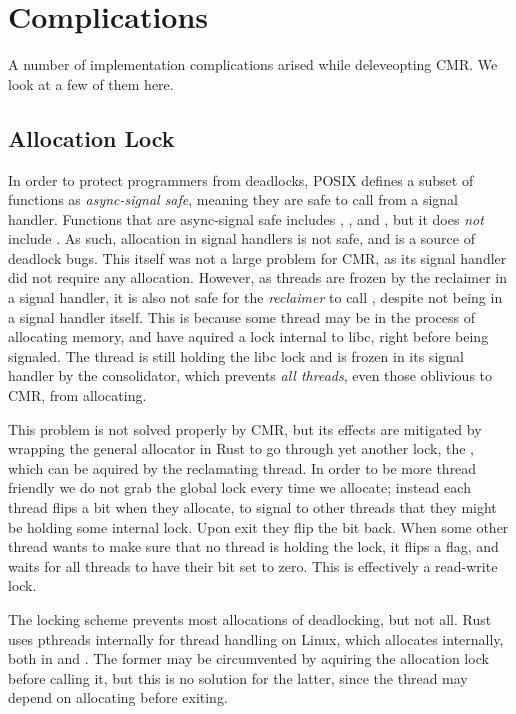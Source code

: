 \section{Complications\label{sec:impl-complications}}

A number of implementation complications arised while deleveopting CMR\@. We look at a few of them
here.

\subsection{Allocation Lock\label{sec:alloc-lock}}

In order to protect programmers from deadlocks, POSIX defines a subset of functions as
\emph{async-signal safe}, meaning they are safe to call from a signal handler. Functions that are
async-signal safe includes , , and , but it does \emph{not}
include . As such, allocation in signal handlers is not safe, and is a source of
deadlock bugs. This itself was not a large problem for CMR, as its signal handler did not require
any allocation. However, as threads are frozen by the reclaimer in a signal handler, it is also not
safe for the \emph{reclaimer} to call , despite not being in a signal handler itself.
This is because some thread may be in the process of allocating memory, and have aquired a lock
internal to libc, right before being signaled. The thread is still holding the libc lock and is
frozen in its signal handler by the consolidator, which prevents \emph{all threads}, even those
oblivious to CMR, from allocating.

This problem is not solved properly by CMR, but its effects are mitigated by wrapping the general
allocator in Rust to go through yet another lock, the , which can be aquired by
the reclamating thread.  In order to be more thread friendly we do not grab the global lock every
time we allocate; instead each thread flips a bit when they allocate, to signal to other threads
that they might be holding some internal lock. Upon exit they flip the bit back. When some other
thread wants to make sure that no thread is holding the lock, it flips a flag, and waits for all
threads to have their bit set to zero. This is effectively a read-write lock.

The locking scheme prevents most allocations of deadlocking, but not all. Rust uses \gls{pthreads}
internally for thread handling on Linux, which allocates internally, both in  and
. The former may be circumvented by aquiring the allocation lock before calling it, but
this is no solution for the latter, since the thread may depend on allocating before exiting.



